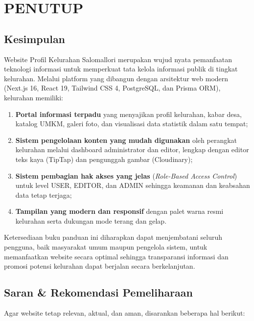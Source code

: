 \documentclass[12pt,a4paper]{report}
\begin{document}
\chapter{PENUTUP}

\section{Kesimpulan}

Website Profil Kelurahan Salomallori merupakan wujud nyata pemanfaatan teknologi informasi untuk memperkuat tata kelola informasi publik di tingkat kelurahan. Melalui platform yang dibangun dengan arsitektur web modern (Next.js 16, React 19, Tailwind CSS 4, PostgreSQL, dan Prisma ORM), kelurahan memiliki:

\begin{enumerate}[leftmargin=2em, itemsep=2pt]
    \item \textbf{Portal informasi terpadu} yang menyajikan profil kelurahan, kabar desa, katalog UMKM, galeri foto, dan visualisasi data statistik dalam satu tempat;
    \item \textbf{Sistem pengelolaan konten yang mudah digunakan} oleh perangkat kelurahan melalui dashboard administrator dan editor, lengkap dengan editor teks kaya (TipTap) dan pengunggah gambar (Cloudinary);
    \item \textbf{Sistem pembagian hak akses yang jelas} (\emph{Role-Based Access Control}) untuk level USER, EDITOR, dan ADMIN sehingga keamanan dan keabsahan data tetap terjaga;
    \item \textbf{Tampilan yang modern dan responsif} dengan palet warna resmi kelurahan serta dukungan mode terang dan gelap.
\end{enumerate}

Ketersediaan buku panduan ini diharapkan dapat menjembatani seluruh pengguna, baik masyarakat umum maupun pengelola sistem, untuk memanfaatkan website secara optimal sehingga transparansi informasi dan promosi potensi kelurahan dapat berjalan secara berkelanjutan.

\section{Saran \& Rekomendasi Pemeliharaan}

Agar website tetap relevan, aktual, dan aman, disarankan beberapa hal berikut:
\end{document}
